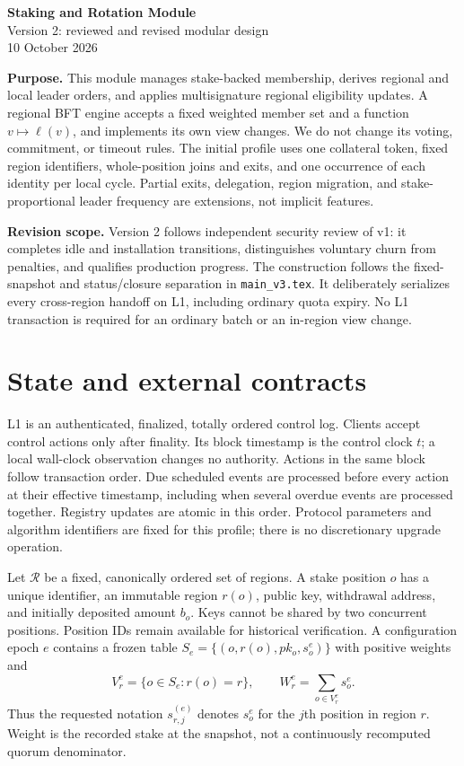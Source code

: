 \documentclass[11pt,a4paper]{article}
\begin{document}
\begin{center}
{\Large\bfseries Staking and Rotation Module}\\[4pt]
{\large Version 2: reviewed and revised modular design}\\[3pt]
10 October 2026
\end{center}

\textbf{Purpose.} This module manages stake-backed membership, derives
regional and local leader orders, and applies multisignature regional
eligibility updates. A regional BFT engine accepts a fixed weighted member
set and a function $v\mapsto\ell(v)$, and implements its own view changes.
We do not change its voting, commitment, or timeout rules. The initial
profile uses one collateral token, fixed region identifiers, whole-position
joins and exits, and one occurrence of each identity per local cycle.
Partial exits, delegation, region migration, and stake-proportional leader
frequency are extensions, not implicit features.

\textbf{Revision scope.} Version 2 follows independent security review of
v1: it completes idle and installation transitions, distinguishes voluntary
churn from penalties, and qualifies production progress. The construction
follows the fixed-snapshot and status/closure
separation in \texttt{main\_v3.tex}. It deliberately serializes every
cross-region handoff on L1, including ordinary quota expiry. No L1
transaction is required for an ordinary batch or an in-region view change.

\section{State and external contracts}
\label{sec:interfaces}

L1 is an authenticated, finalized, totally ordered control log. Clients
accept control actions only after finality. Its block timestamp is the
control clock $t$; a local wall-clock observation changes no authority.
Actions in the same block follow transaction order. Due scheduled events
are processed before every action at their effective timestamp, including
when several overdue events are processed together. Registry updates are
atomic in this order. Protocol parameters and algorithm identifiers are
fixed for this profile; there is no discretionary upgrade operation.

Let $\mathcal R$ be a fixed, canonically ordered set of regions. A stake
position $o$ has a unique identifier, an immutable region $r(o)$, public
key, withdrawal address, and initially deposited amount $b_o$. Keys cannot
be shared by two concurrent positions. Position IDs remain available for
historical verification. A configuration epoch $e$ contains a frozen table
$S_e=\{(o,r(o),pk_o,s_o^e)\}$ with positive weights and
\[
 V_r^e=\{o\in S_e:r(o)=r\},\qquad
 W_r^e=\sum_{o\in V_r^e}s_o^e.
\]
Thus the requested notation $s_{r,j}^{(e)}$ denotes $s_o^e$ for the
$j$th position in region $r$. Weight is the recorded stake at the snapshot,
not a continuously recomputed quorum denominator.
\end{document}
